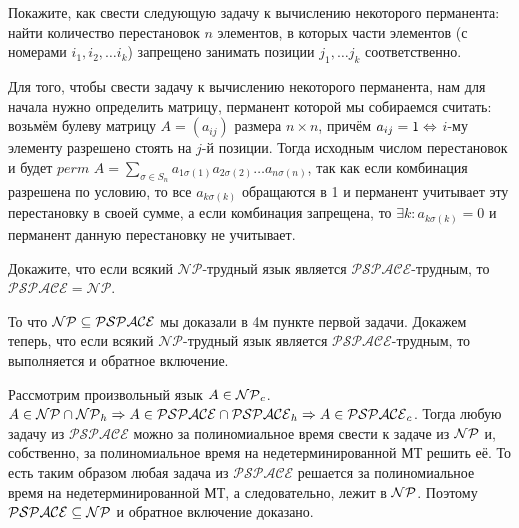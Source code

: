 \documentclass[a4paper,12pt]{article}
\begin{document}
\begin{tasknum}{2}
	Покажите, как свести следующую задачу к вычислению некоторого перманента: найти количество перестановок $n$ элементов, в которых части элементов (с номерами $i_1, i_2,\dotsc i_k$) запрещено занимать позиции $j_1, \dotsc j_k$ соответственно.
\end{tasknum}

\begin{solution}
	
	Для того, чтобы свести задачу к вычислению некоторого перманента, нам для начала нужно определить матрицу, перманент которой мы собираемся считать: возьмём булеву матрицу $A = (a_{ij})$ размера $n \times n$, причём $a_{ij} = 1 \Leftrightarrow$ $i$-му элементу разрешено стоять на $j$-й позиции. Тогда исходным числом перестановок и будет $perm$ $A = \displaystyle\sum_{\sigma \in S_n} a_{1\sigma(1)} a_{2\sigma(2)} \ldots a_{n\sigma(n)}$, так как если комбинация разрешена по условию, то все $a_{k\sigma(k)}$ обращаются в 1 и перманент учитывает эту перестановку в своей сумме, а если комбинация запрещена, то $\exists k: a_{k\sigma(k)} = 0$ и перманент данную перестановку не учитывает.
	
\end{solution}

\begin{tasknum}{3}
	Докажите, что если всякий $\mathcal{NP}$-трудный язык является $\mathcal{PSPACE}$-трудным, то $\mathcal{PSPACE} = \mathcal{NP}$.
\end{tasknum}

\begin{solution}
	
	То что $\mathcal{NP} \subseteq \mathcal{PSPACE}$ мы доказали в 4м пункте первой задачи. Докажем теперь, что если всякий $\mathcal{NP}$-трудный язык является $\mathcal{PSPACE}$-трудным, то выполняется и обратное включение.
	
	Рассмотрим произвольный язык $A \in \mathcal{NP}_c$. $A \in \mathcal{NP} \cap \mathcal{NP}_h \Rightarrow A \in \mathcal{PSPACE} \cap \mathcal{PSPACE}_h \Rightarrow A \in \mathcal{PSPACE}_c$. Тогда любую задачу из $\mathcal{PSPACE}$ можно за полиномиальное время свести к задаче из $\mathcal{NP}$ и, собственно, за полиномиальное время на недетерминированной МТ решить её. То есть таким образом любая задача из $\mathcal{PSPACE}$ решается за полиномиальное время на недетерминированной МТ, а следовательно, лежит в $\mathcal{NP}$. Поэтому $\mathcal{PSPACE} \subseteq \mathcal{NP}$ и обратное включение доказано.
	
\end{solution}
\end{document}

